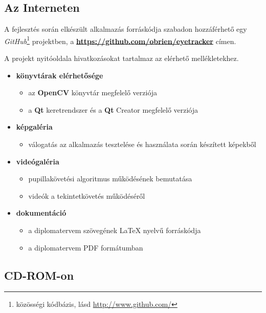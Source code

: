 \subsection{Az Interneten}\label{sect:interneten}

A fejlesztés során elkészült alkalmazás forráskódja szabadon hozzáférhető egy \emph{GitHub}\footnote{közösségi kódbázis, lásd \url{http://www.github.com/}} projektben, a \textbf{\url{https://github.com/obrien/eyetracker}} címen.

A projekt nyitóoldala hivatkozásokat tartalmaz az elérhető mellékletekhez. 

\begin{itemize}
    \item \textbf{könyvtárak elérhetősége}
    \begin{itemize}
      \item az \textbf{OpenCV} könyvtár megfelelő verziója
      \item a \textbf{Qt} keretrendszer és a \textbf{Qt} Creator megfelelő verziója
    \end{itemize}
    
  \item \textbf{képgaléria}
    \begin{itemize}
      \item válogatás az alkalmazás tesztelése és használata során készített képekből
    \end{itemize}
    
  \item \textbf{videógaléria}
    \begin{itemize}
      \item pupillakövetési algoritmus működésének bemutatása
      \item videók a tekintetkövetés működéséről
    \end{itemize}

  \item \textbf{dokumentáció}
    \begin{itemize}
      \item a diplomatervem szövegének \LaTeX{} nyelvű forráskódja
      \item a diplomatervem PDF formátumban
    \end{itemize}
\end{itemize}

\subsection{CD-ROM-on}\label{sect:cdromon}

